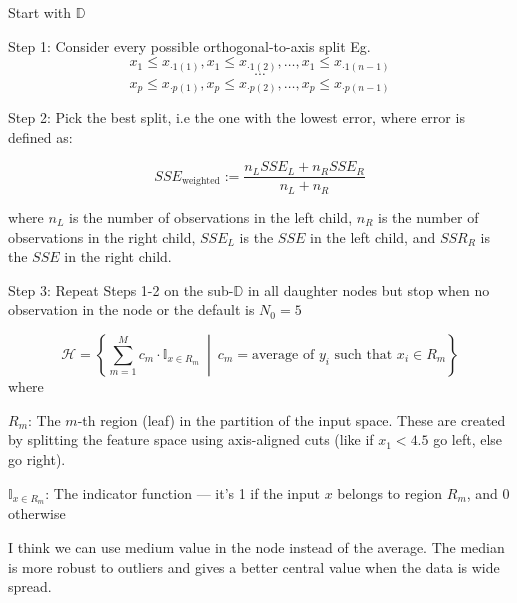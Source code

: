 \documentclass[12pt]{article}
\begin{document}
\begin{enumerate}

 Start with $\mathbb{D}$

Step 1: Consider every possible orthogonal-to-axis split
Eg.
 \[
 x_1 \leq x_{\cdot 1(1)},  x_1 \leq x_{\cdot 1(2)}, \dots,  x_1 \leq x_{\cdot 1(n-1)} 
 \]
 \[\cdots\]
 \[
  x_p \leq x_{\cdot p(1)}, x_p \leq x_{\cdot p(2)}, \dots, x_p \leq x_{\cdot p(n-1)} 
 \]

Step 2: Pick the best split, i.e the one with the lowest error, where error is defined as: 

\[
SSE_{\text{weighted}} := \frac{n_L SSE_L + n_R SSE_R}{n_L + n_R}
\]

where $n_L$ is the number of observations in the left child,
				$n_R$ is the number of observations in the right child, $SSE_L$
				is the $SSE$ in the left child, and $SSR_R$ is the $SSE$ in
				the right child. 

Step 3: Repeat Steps 1-2 on the sub-$\mathbb{D}$ in all daughter nodes but stop when no observation in the node or the default is $N_0 = 5$




\[
\mathcal{H} = \left\{ \sum_{m=1}^{M} c_m \cdot \mathbb{I}_{x \in R_m} \ \middle| \ c_m = \text{average of } y_i \text{ such that } x_i \in R_m \right\}
\]
where 

$R_m$: The $m$-th region (leaf) in the partition of the input space. These are created by splitting the feature space using axis-aligned cuts (like if $x_1 < 4.5$ go left, else go right).

$\mathbb{I}_ {x \in R_m}$: The indicator function — it’s 1 if the input $x$ belongs to region $R_m$, and 0 otherwise


I think we can use medium value in the node instead of the average. The median is more robust to outliers and gives a better central value when the data is wide spread.



\end{enumerate}
\end{document}
